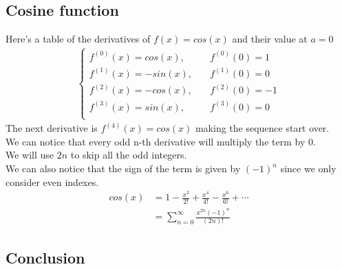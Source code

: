 \documentclass{article}
\begin{document}
\subsection{Cosine function}

Here's a table of the derivatives of \(f(x)=cos(x)\) and their value at \(a=0\)
\begin{align*}
    \begin{cases}
        f^{(0)}(x)=cos(x), \quad &f^{(0)}(0)=1 \\
        f^{(1)}(x)=-sin(x),\quad &f^{(1)}(0)=0 \\
        f^{(2)}(x)=-cos(x),\quad &f^{(2)}(0)=-1\\
        f^{(3)}(x)=sin(x), \quad &f^{(3)}(0)=0 \\
    \end{cases}
\end{align*}
The next derivative is \(f^{(4)}(x)=cos(x)\) making the sequence start over.
\\
We can notice that every odd n-th derivative will multiply the term by \(0\).
\\
We will use \(2n\) to skip all the odd integers.
\\
We can also notice that the sign of the term is given by \((-1)^n\) since we only consider even indexes.
\begin{align*}
    cos(x)&=1-\frac{x^2}{2!}+\frac{x^4}{4!}-\frac{x^6}{6!}+\cdots
    \\
    &=\sum_{n=0}^{\infty}\frac{x^{2n}(-1)^n}{(2n)!}
\end{align*}

\pagebreak

\subsection{Conclusion}
\end{document}
